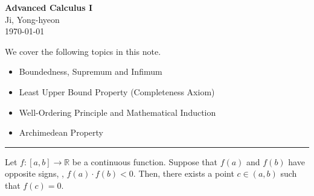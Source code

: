 \documentclass[11pt,openany]{article}
\begin{document}
\begin{center}
	\huge\textbf{Advanced Calculus I}\\
	\vspace{0.5em}
	\large{Ji, Yong-hyeon}\\
	\vspace{0.5em}
	\normalsize{\today}\\
\end{center}

\noindent We cover the following topics in this note.
\begin{itemize}
	\item Boundedness, Supremum and Infimum
	\item Least Upper Bound Property (Completeness Axiom)
	\item Well-Ordering Principle and Mathematical Induction
	\item Archimedean Property
\end{itemize}
\hrule\vspace{12pt}
\begin{observation}
	Let \( f: [a, b] \rightarrow \mathbb{R} \) be a continuous function. Suppose that \( f(a) \) and \( f(b) \) have opposite signs, \ie, \( f(a) \cdot f(b) < 0 \). Then, there exists a point \( c \in (a, b) \) such that $f(c) = 0$. \begin{center}
		
	\end{center}
\end{observation}
\vfill
{}

\newpage
\tableofcontents
\vfill
\end{document}
